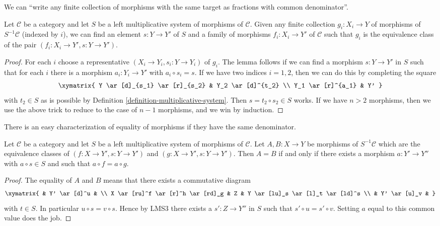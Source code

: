 \noindent
We can ``write any finite collection of morphisms with the same target
as fractions with common denominator''.

\begin{lemma}
\label{lemma-morphisms-left-localization}
Let $\mathcal{C}$ be a category and let $S$ be a left multiplicative
system of morphisms of $\mathcal{C}$. Given any finite collection
$g_i : X_i \to Y$ of morphisms of $S^{-1}\mathcal{C}$
(indexed by $i$),
we can find an element $s : Y \to Y'$ of $S$ and
a family of morphisms $f_i : X_i \to Y'$ of $\mathcal{C}$ such that
$g_i$ is the equivalence class of the pair
$(f_i : X_i \to Y', s : Y \to Y')$.
\end{lemma}

\begin{proof}
For each $i$ choose a representative $(X_i \to Y_i, s_i : Y \to Y_i)$
of $g_i$.
The lemma follows if we can find a morphism $s : Y \to Y'$ in $S$ such that
for each $i$ there is a morphism $a_i : Y_i \to Y'$ with
$a_i \circ s_i = s$. If we have two indices $i = 1, 2$, then we can
do this by completing the square
$$
\xymatrix{
Y \ar[d]_{s_1} \ar[r]_{s_2} & Y_2 \ar[d]^{t_2} \\
Y_1 \ar[r]^{a_1} & Y'
}
$$
with $t_2 \in S$ as is possible by
Definition \ref{definition-multiplicative-system}.
Then $s = t_2 \circ s_2 \in S$ works.
If we have $n > 2$ morphisms, then we use the above trick to reduce
to the case of $n - 1$ morphisms, and we win by induction.
\end{proof}

\noindent
There is an easy characterization of equality of morphisms if they
have the same denominator.

\begin{lemma}
\label{lemma-equality-morphisms-left-localization}
Let $\mathcal{C}$ be a category and let $S$ be a left multiplicative
system of morphisms of $\mathcal{C}$. Let $A, B : X \to Y$ be
morphisms of $S^{-1}\mathcal{C}$ which are the equivalence
classes of $(f : X \to Y', s : Y \to Y')$ and
$(g : X \to Y', s : Y \to Y')$. Then
$A = B$ if and only if there exists a morphism
$a : Y' \to Y''$ with $a \circ s \in S$ and
such that $a \circ f = a \circ g$.
\end{lemma}

\begin{proof}
The equality of $A$ and $B$ means that there exists a commutative diagram
$$
\xymatrix{
 & Y' \ar[d]^u & \\
X \ar[ru]^f \ar[r]^h \ar[rd]_g &
Z &
Y \ar[lu]_s \ar[l]_t \ar[ld]^s \\
& Y' \ar[u]_v &
}
$$
with $t \in S$. In particular $u \circ s = v \circ s$. Hence by LMS3 there
exists a $s' : Z \to Y''$ in $S$ such that $s' \circ u = s' \circ v$.
Setting $a$ equal to this common value does the job.
\end{proof}

